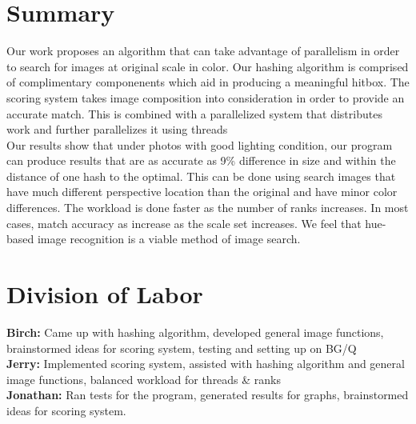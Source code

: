 \documentclass[10pt, journal]{vgtc}                %
\newcommand\tab[1][1cm]{\hspace*{#1}}
\begin{document}
\section{Summary}
\begin{flushleft}
	\tab Our work proposes an algorithm that can take advantage of parallelism in order to search for images at original scale in color. Our hashing algorithm is comprised of complimentary componenents which aid in producing a meaningful hitbox. The scoring system takes image composition into consideration in order to provide an accurate match. This is combined with a parallelized system that distributes work and further parallelizes it using threads\\\smallskip
	\tab Our results show that under photos with good lighting condition, our program can produce results that are as accurate as 9\% difference in size and within the distance of one hash to the optimal. This can be done using search images that have much different perspective location than the original and have minor color differences. The workload is done faster as the number of ranks increases. In most cases, match accuracy as increase as the scale set increases. We feel that hue-based image recognition is a viable method of image search.
\end{flushleft}


\section{Division of Labor}
\textbf{Birch:} Came up with hashing algorithm, developed general image functions, brainstormed ideas for scoring system, testing and setting up on BG/Q\\
\textbf{Jerry:} Implemented scoring system, assisted with hashing algorithm and general image functions, balanced workload for threads \& ranks\\
\textbf{Jonathan:} Ran tests for the program, generated results for graphs, brainstormed ideas for scoring system.





\nocite{*}

\end{document}
